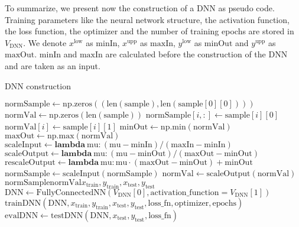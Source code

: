 To summarize, we present now the construction of a DNN as pseudo code. Training parameters like the neural network structure, the activation function, the loss function, the optimizer and the number of training epochs are stored in $V_\mathrm{DNN}$. We denote $x^\mathrm{low}$ as $\mathrm{minIn}$, $x^\mathrm{upp}$ as $\mathrm{maxIn}$, $y^\mathrm{low}$ as $\mathrm{minOut}$ and $y^\mathrm{upp}$ as $\mathrm{maxOut}$. $\mathrm{minIn}$ and $\mathrm{maxIn}$ are calculated before the construction of the DNN and are taken as an input.

\begin{algorithm}[H]%
\caption{DNN construction}
\begin{algorithmic}[1]
\State $\mathrm{normSample} \gets \mathrm{np.zeros}((\mathrm{len}(\mathrm{sample}), \mathrm{len}(\mathrm{sample}[0][0])))$
\State $\mathrm{normVal} \gets \mathrm{np.zeros}(\mathrm{len}(\mathrm{sample}))$
\State $\mathrm{normSample}[i, :] \gets \mathrm{sample}[i][0]$
\State $\mathrm{normVal}[i] \gets \mathrm{sample}[i][1]$
\EndFor
\State $\mathrm{minOut} \gets \mathrm{np.min}(\mathrm{normVal})$
\State $\mathrm{maxOut} \gets \mathrm{np.max}(\mathrm{normVal})$
\State $\mathrm{scaleInput} \gets \mathbf{lambda}\:\mathrm{mu}: (\mathrm{mu}-\mathrm{minIn})/(\mathrm{maxIn}-\mathrm{minIn})$
\State $\mathrm{scaleOutput} \gets \mathbf{lambda}\:\mathrm{mu}: (\mathrm{mu}-\mathrm{minOut})/(\mathrm{maxOut}-\mathrm{minOut})$
\State $\mathrm{rescaleOutput} \gets \mathbf{lambda}\:\mathrm{mu}: \mathrm{mu}\cdot(\mathrm{maxOut}-\mathrm{minOut})+\mathrm{minOut}$
\State $\mathrm{normSample} \gets \mathrm{scaleInput}(\mathrm{normSample})$
\State $\mathrm{normVal} \gets \mathrm{scaleOutput}(\mathrm{normVal})$
\State {}$\mathrm{normSample}$$\mathrm{normVal}$$x_\mathrm{train}, y_\mathrm{train}, x_\mathrm{test}, y_\mathrm{test}$
\State $\mathrm{DNN} \gets \mathrm{FullyConnectedNN}(V_\mathrm{DNN}[0], \mathrm{activation\_function}=V_\mathrm{DNN}[1])$
\State $\mathrm{trainDNN}(\mathrm{DNN}, x_\mathrm{train}, y_\mathrm{train}, x_\mathrm{test}, y_\mathrm{test}, \mathrm{loss\_fn}, \mathrm{optimizer}, \mathrm{epochs})$
\State $\mathrm{evalDNN} \gets \mathrm{testDNN}(\mathrm{DNN}, x_\mathrm{test}, y_\mathrm{test}, \mathrm{loss\_fn})$

\end{algorithmic}
\end{algorithm}
